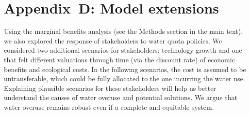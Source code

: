 \documentclass[default, sn-standardnature]{sn-jnl}
\begin{document}
\section{Appendix~D: Model extensions}\label{secS5}
\renewcommand{\thefigure}{D\arabic{figure}}
\renewcommand{\thetable}{D\arabic{table}}
\setcounter{figure}{0}
\setcounter{table}{0}
Using the marginal benefits analysis (see the Methods section in the main text), we also explored the response of stakeholders to water quota policies. We considered two additional scenarios for stakeholders: technology growth and one that felt different valuations through time (via the discount rate) of economic benefits and ecological costs. In the following scenarios, the cost is assumed to be untransferable, which could be fully allocated to the one incurring the water use. Explaining plausible scenarios for these stakeholders will help us better understand the causes of water overuse and potential solutions. We argue that water overuse remains robust even if a complete and equitable system.
\end{document}
